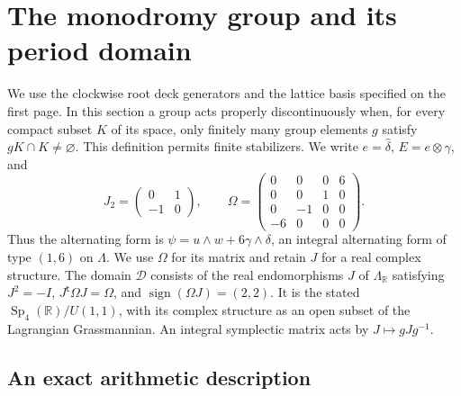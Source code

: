 \section{The monodromy group and its period domain}\label{fam:section:F}

We use the clockwise root deck generators and the lattice basis specified
on the first page.  In this section a group acts properly discontinuously when, for every
compact subset $K$ of its space, only finitely many group elements $g$ satisfy
$gK\cap K\ne\varnothing$.  This definition permits finite stabilizers.  We
write $e=\widehat\delta$, $E=e\otimes\gamma$, and
\[
 J_2=\begin{pmatrix}0&1\\-1&0\end{pmatrix},\qquad
 \Omega=\begin{pmatrix}
 0&0&0&6\\0&0&1&0\\0&-1&0&0\\-6&0&0&0
 \end{pmatrix}.
\]
Thus the alternating form is
$\psi=u\wedge w+6\gamma\wedge\delta$, an integral alternating form of
type $(1,6)$ on $\Lambda$.  We use $\Omega$ for its matrix and retain $J$ for
a real complex structure.  The domain $\mathcal D$ consists of the real
endomorphisms $J$ of $\Lambda_{\mathbb R}$ satisfying
$J^2=-I$, $J^{\mathsf t}\Omega J=\Omega$, and
$\operatorname{sign}(\Omega J)=(2,2)$.  It is the stated
$\operatorname{Sp}_4(\mathbb R)/U(1,1)$, with its complex structure as an
open subset of the Lagrangian Grassmannian.  An integral symplectic matrix
acts by $J\mapsto gJg^{-1}$.

\subsection{An exact arithmetic description}\label{fam:section:F.1}

